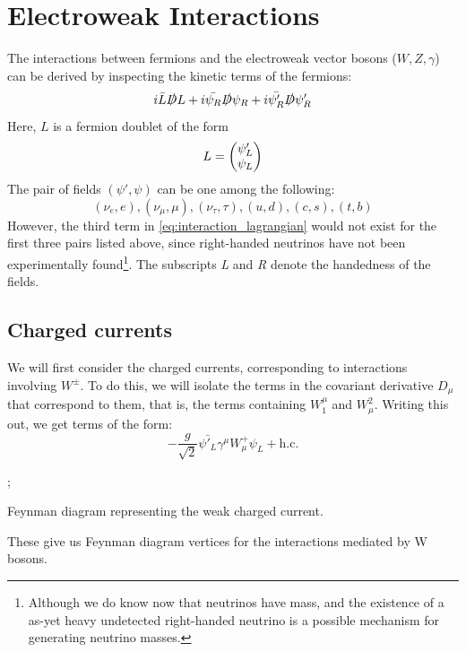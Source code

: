 \section{Electroweak Interactions}

The interactions between fermions and the electroweak vector bosons ($W,Z,\gamma$) can be derived by inspecting the kinetic terms of the fermions:
\begin{equation}
  i\bar{L}\slashed{D}L + i\bar{\psi_R}\slashed{D}\psi_R + i\bar{\psi'_R}\slashed{D}\psi'_R
\label{eq:interaction_lagrangian}
\end{equation}
Here, $L$ is a fermion doublet of the form
$$L = \begin{pmatrix} \psi'_L \\ \psi_L\end{pmatrix}$$
The pair of fields $(\psi', \psi)$ can be one among the following: 
$$(\nu_e,e), (\nu_\mu,\mu), (\nu_\tau, \tau), (u, d), (c, s), (t, b)$$
However, the third term in \eqref{eq:interaction_lagrangian} would not exist for the first three pairs listed above, since right-handed neutrinos have not been experimentally found\footnote{Although we do know now that neutrinos have mass, and the existence of a as-yet heavy undetected right-handed neutrino is a possible mechanism for generating neutrino masses.}. The subscripts \emph{L} and \emph{R} denote the handedness of the fields.
\subsection{Charged currents}
We will first consider the charged currents, corresponding to interactions involving $W^\pm$. To do this, we will isolate the terms in the covariant derivative $D_\mu$ that correspond to them, that is, the terms containing $W_1^\mu$ and $W_\mu^2$. Writing this out, we get terms of the form:
\begin{equation*}
  -\frac{g}{\sqrt{2}}\bar{\psi'_L}\gamma^\mu W_\mu^+\psi_L + \text{h.c}.
\end{equation*}
\begin{marginfigure}
;
\caption{Feynman diagram representing the weak charged current.}
\end{marginfigure}
These give us Feynman diagram vertices for the interactions mediated by W bosons.

